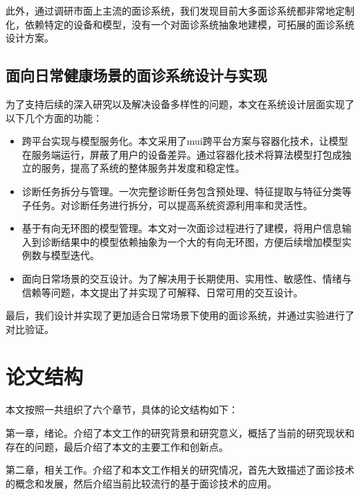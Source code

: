 此外，通过调研市面上主流的面诊系统，我们发现目前大多面诊系统都非常地定制化，依赖特定的设备和模型，没有一个对面诊系统抽象地建模，可拓展的面诊系统设计方案。


\subsection{面向日常健康场景的面诊系统设计与实现}

为了支持后续的深入研究以及解决设备多样性的问题，本文在系统设计层面实现了以下几个方面的功能：

\begin{itemize}

    \item 跨平台实现与模型服务化。本文采用了mui跨平台方案与容器化技术，让模型在服务端运行，屏蔽了用户的设备差异。通过容器化技术将算法模型打包成独立的服务，提高了系统的整体服务并发度和稳定性。

    \item 诊断任务拆分与管理。一次完整诊断任务包含预处理、特征提取与特征分类等子任务。对诊断任务进行拆分，可以提高系统资源利用率和灵活性。
    
    \item 基于有向无环图的模型管理。本文对一次面诊过程进行了建模，将用户信息输入到诊断结果中的模型依赖抽象为一个大的有向无环图，方便后续增加模型实例数与模型迭代。
    
    \item 面向日常场景的交互设计。为了解决用于长期使用、实用性、敏感性、情绪与信赖等问题，本文提出了并实现了可解释、日常可用的交互设计。

\end{itemize}

最后，我们设计并实现了更加适合日常场景下使用的面诊系统，并通过实验进行了对比验证。

\section{论文结构}
本文按照一共组织了六个章节，具体的论文结构如下：

第一章，绪论。介绍了本文工作的研究背景和研究意义，概括了当前的研究现状和存在的问题，最后介绍了本文的主要工作和创新点。

第二章，相关工作。介绍了和本文工作相关的研究情况，首先大致描述了面诊技术的概念和发展，然后介绍当前比较流行的基于面诊技术的应用。

